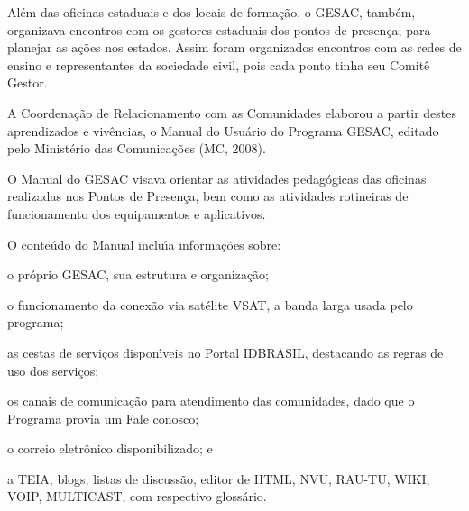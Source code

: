 \documentclass[
12pt,		%
openright,	%
twoside,  %
a4paper,			%
chapter=TITLE,		%
english,			%
french,				%
spanish,			%
brazil				%
]{USPSC-classe/USPSC}
\begin{document}
Al\'em das oficinas estaduais e dos locais de forma\c{c}\~ao, o GESAC, tamb\'em, organizava encontros com os gestores estaduais dos pontos de presen\c{c}a, para planejar as a\c{c}\~oes nos estados. Assim foram organizados encontros com as redes de ensino e  representantes da sociedade civil, pois cada ponto  tinha seu Comit\^e Gestor.

















A Coordena\c{c}\~ao de Relacionamento com as Comunidades elaborou a partir destes aprendizados e viv\^encias, o \textquotedbl Manual do Usu\'ario do Programa GESAC\textquotedbl , editado pelo Minist\'erio das Comunica\c{c}\~oes (MC, 2008).

















O Manual do GESAC visava  orientar as atividades pedag\'ogicas das oficinas realizadas nos Pontos de Presen\c{c}a, bem como as  atividades rotineiras de funcionamento dos equipamentos e aplicativos.

















O conte\'udo do Manual inclu\'{\i}a informa\c{c}\~oes sobre:


















\begin{alineas}
\item o pr\'oprio GESAC, sua estrutura e organiza\c{c}\~ao;
\item o funcionamento da conex\~ao via sat\'elite VSAT, a banda larga usada pelo programa;
\item as cestas de servi\c{c}os dispon\'{\i}veis no Portal IDBRASIL, destacando as regras de uso dos servi\c{c}os;
\item os canais de comunica\c{c}\~ao para atendimento das comunidades, dado que o Programa provia um \textquotedbl Fale conosco\textquotedbl ;
\item  o correio eletr\^onico disponibilizado; e
\item a TEIA, blogs, listas de discuss\~ao, editor de HTML, NVU, RAU-TU, WIKI, VOIP, MULTICAST, com respectivo gloss\'ario.
\end{alineas}
\end{document}
